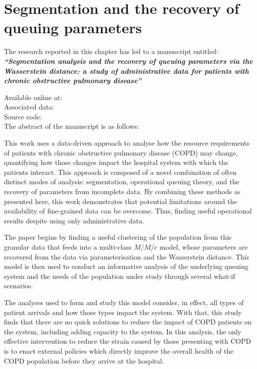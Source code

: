\chapter{Segmentation and the recovery of queuing parameters}

\graphicspath{{chapters/copd/paper/img/}}


\begin{center}
    The research reported in this chapter has led to a manuscript
    entitled:\\[1em]

    {%
        \bf\itshape{``Segmentation analysis and the recovery of queuing
                    parameters via the Wasserstein distance: a study of
                    administrative data for patients with chronic obstructive
                    pulmonary disease''}
    }

    Available online at: \\
    Associated data: \\
    Source code: \\[2em]

    The abstract of the manuscript is as follows:\\[1em]
\end{center}

This work uses a data-driven approach to analyse how the resource requirements
of patients with chronic obstructive pulmonary disease (COPD) may change,
quantifying how those changes impact the hospital system with which the patients
interact. This approach is composed of a novel combination of often distinct
modes of analysis: segmentation, operational queuing theory, and the recovery of
parameters from incomplete data. By combining these methods as presented here,
this work demonstrates that potential limitations around the availability of
fine-grained data can be overcome. Thus, finding useful operational results
despite using only administrative data.

The paper begins by finding a useful clustering of the population from this
granular data that feeds into a multi-class \(M/M/c\) model, whose parameters
are recovered from the data via parameterisation and the Wasserstein distance.
This model is then used to conduct an informative analysis of the underlying
queuing system and the needs of the population under study through several
what-if scenarios.

The analyses used to form and study this model consider, in effect, all types of
patient arrivals and how those types impact the system. With that, this study
finds that there are no quick solutions to reduce the impact of COPD patients on
the system, including adding capacity to the system. In this analysis, the only
effective intervention to reduce the strain caused by those presenting with COPD
is to enact external policies which directly improve the overall health of the
COPD population before they arrive at the hospital.

